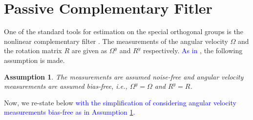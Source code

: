 \documentclass{article}
\newcommand{\Omegay}{\Omega^y}
\newtheorem{assumption}{Assumption}
\newcommand{\textblue}[1]{\textcolor{blue}{#1}}
\begin{document}
\section{Passive Complementary Fitler}

One of the standard tools for estimation on the special orthogonal groups is the nonlinear complementary filter \cite{mahony_complementaryFilter}. The measurements of the angular velocity $\Omega$ and the rotation matrix $R$ are given as $\Omegay$ and $R^y$ respectively. \textblue{As in \cite{mahony_complementaryFilter}}, the following assumption is made. 
\begin{assumption} \label{ass:no_meas_noise}
    The measurements are assumed noise-free and angular velocity measurements are assumed bias-free, i.e., {$\Omegay=\Omega$ and $R^y = R$.}
\end{assumption}

Now, we re-state below \textblue{{\cite[Theorem 4.2]{mahony_complementaryFilter}}} \textblue{with the simplification of considering angular velocity measurements bias-free as in Assumption \ref{ass:no_meas_noise}.}
\end{document}
